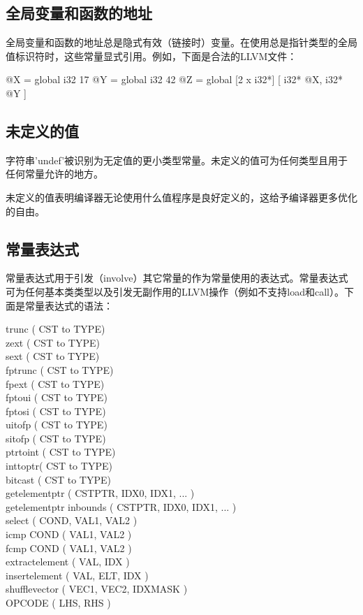 \documentclass[12pt,a4paper]{article}
\begin{document}
{\subsection{全局变量和函数的地址}

全局变量和函数的地址总是隐式有效（链接时）变量。在使用总是指针类型的全局值标识符时，这些常量显式引用。例如，下面是合法的LLVM文件：

@X = global i32 17
@Y = global i32 42
@Z = global [2 x i32*] [ i32* @X, i32* @Y ]

\subsection{未定义的值}

字符串'undef'被识别为无定值的更小类型常量。未定义的值可为任何类型且用于任何常量允许的地方。

未定义的值表明编译器无论使用什么值程序是良好定义的，这给予编译器更多优化的自由。

\subsection{常量表达式} %

常量表达式用于引发（involve）其它常量的作为常量使用的表达式。常量表达式可为任何基本类类型以及引发无副作用的LLVM操作（例如不支持load和call）。下面是常量表达式的语法：

\begin{description}
\item[trunc ( CST to TYPE)] 
\item[zext ( CST to TYPE)] 
\item[sext ( CST to TYPE)] 
\item[fptrunc ( CST to TYPE)] 
\item[fpext ( CST to TYPE)] 
\item[fptoui ( CST to TYPE)] 
\item[fptosi ( CST to TYPE)] 
\item[uitofp ( CST to TYPE)] 
\item[sitofp ( CST to TYPE)] 
\item[ptrtoint ( CST to TYPE)] 
\item[inttoptr( CST to TYPE)] 
\item[bitcast ( CST to TYPE)] 
\item[getelementptr ( CSTPTR, IDX0, IDX1, ... )]
\item[getelementptr inbounds ( CSTPTR, IDX0, IDX1, ... )] 
\item[select ( COND, VAL1, VAL2 )] 
\item[icmp COND ( VAL1, VAL2 )] 
\item[fcmp COND ( VAL1, VAL2 )] 
\item[extractelement ( VAL, IDX )] 
\item[insertelement ( VAL, ELT, IDX )] 
\item[shufflevector ( VEC1, VEC2, IDXMASK )] 
\item[OPCODE ( LHS, RHS )] 
\end{description}

}
\end{document}
